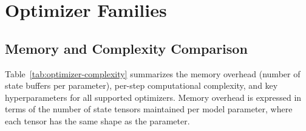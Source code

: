 \section{Optimizer Families}
\label{sec:annex-optimizers}

\subsection{Memory and Complexity Comparison}

Table~\ref{tab:optimizer-complexity} summarizes the memory overhead (number of state buffers per parameter), per-step computational complexity, and key hyperparameters for all supported optimizers. Memory overhead is expressed in terms of the number of state tensors maintained per model parameter, where each tensor has the same shape as the parameter.


